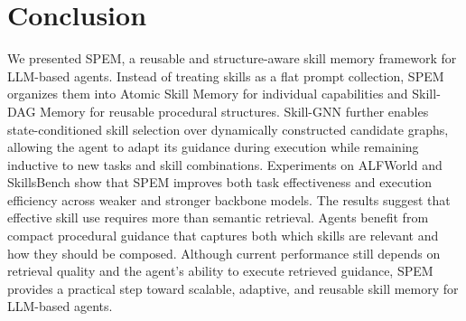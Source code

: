 \documentclass[letterpaper]{article} %
\newcommand{\model}{\textsc{SPEM}}
\begin{document}
\section{Conclusion}

We presented \model{}, a reusable and structure-aware skill memory framework for
LLM-based agents. Instead of treating skills as a flat prompt collection, \model{}
organizes them into Atomic Skill Memory for individual capabilities and
Skill-DAG Memory for reusable procedural structures. Skill-GNN further enables
state-conditioned skill selection over dynamically constructed candidate graphs, allowing the agent to adapt its guidance during execution while remaining inductive to new tasks and skill combinations.
Experiments on ALFWorld and SkillsBench show that \model{} improves both task effectiveness and execution efficiency across weaker and stronger backbone models. The results suggest that effective skill use requires more than semantic retrieval. Agents benefit from compact procedural guidance that captures both which skills are relevant and how they should be composed. Although current performance still depends on retrieval quality and the agent's ability to execute retrieved guidance, \model{} provides a practical step toward scalable, adaptive, and reusable skill memory for LLM-based agents.



% 
\end{document}

